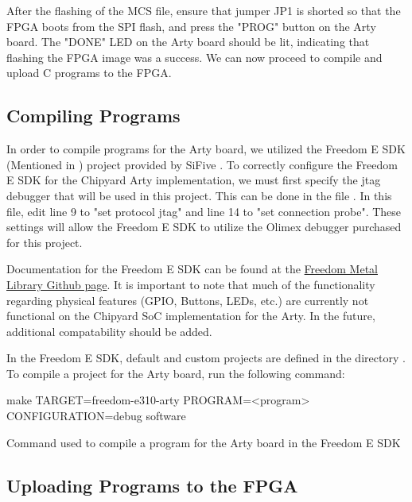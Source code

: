 	After the flashing of the MCS file, ensure that jumper JP1 is shorted so that the FPGA boots from the SPI flash, and press the "PROG" button on the Arty board. 
	The "DONE" LED on the Arty board should be lit, indicating that flashing the FPGA image was a success. 
	We can now proceed to compile and upload C programs to the FPGA.
	
\subsection{Compiling Programs}\label{sec:Compiling_Programs}
	In order to compile programs for the Arty board, we utilized the Freedom E SDK (Mentioned in ) project provided by SiFive \cite{freedomESDK}. 
	To correctly configure the Freedom E SDK for the Chipyard Arty implementation, we must first specify the \Gls{jtag} debugger that will be used in this project. 
	This can be done in the file . 
	In this file, edit line 9 to "set protocol jtag" and line 14 to "set connection probe". 
	These settings will allow the Freedom E SDK to utilize the Olimex debugger purchased for this project. 
	
	Documentation for the Freedom E SDK can be found at the \href{https://sifive.github.io/freedom-metal-docs/}{Freedom Metal Library Github page}.
	It is important to note that much of the functionality regarding physical features (GPIO, Buttons, LEDs, etc.) are currently not functional on the Chipyard SoC implementation for the Arty. In the future, additional compatability should be added.
	
	In the Freedom E SDK, default and custom projects are defined in the directory . To compile a project for the Arty board, run the following command:

	\begin{listing}[h!tbp]
		\begin{bashsource}
			make TARGET=freedom-e310-arty PROGRAM=<program> CONFIGURATION=debug software
		\end{bashsource}
		\caption{Command used to compile a program for the Arty board in the Freedom E SDK}
		\label{lst:compile_in_sdk}
	\end{listing}
	
	
	
\subsection{Uploading Programs to the FPGA}\label{sec:Upload_Programs_to_Flashed_FPGA}
	
